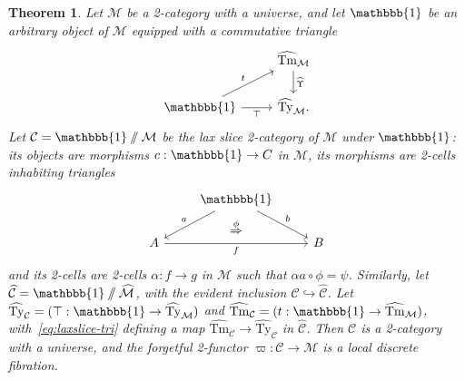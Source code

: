\documentclass[10pt]{article}
\newtheorem{theorem}{Theorem}
\theoremstyle{definition}
\newcommand\M{\mathcal{M}}
\newcommand\Mhat{\widehat{\mathcal{M}}}
\newcommand\Mtyhat{{\widehat{\mathrm{Ty}}_{\M}}}
\newcommand\Mtmhat{{\widehat{\mathrm{Tm}}_{\M}}}
\newcommand\Upshat{{\widehat{\Upsilon}}}
\newcommand\C{\mathcal{C}}
\newcommand\Chat{{\widehat{\mathcal{C}}}}
\newcommand\Ctyhat{{\widehat{\mathrm{Ty}}}_{\C}}
\newcommand\Ctmhat{{\widehat{\mathrm{Tm}}}_{\C}}
\newcommand\vp{\varpi}
\newcommand\one{\mathbbb{1}}
\begin{document}
\begin{theorem}\label{thm:laxslice-2cwf}
  Let $\M$ be a 2-category with a universe, and let $\one$ be an arbitrary object of $\M$ equipped with a commutative triangle
  \begin{equation}
    \begin{tikzcd}
      & \Mtmhat \ar[d,"\Upshat"] \\
      \one \ar[ur,"t"] \ar[r,"\top"'] & \Mtyhat.
    \end{tikzcd}\label{eq:laxslice-tri}
  \end{equation}
  Let $\C = \one\sslash \M$ be the lax slice 2-category of $\M$ under $\one$: its objects are morphisms $c:\one\to C$ in $\M$, its morphisms are 2-cells inhabiting triangles
  \begin{equation}\label{eq:laxslice-mor}
    \begin{tikzcd}
      & \one \ar[dl,"a"'] \ar[dr,"b"] \ar[d,phantom,"\overset{\phi}{\Rightarrow}"] \\
      A \ar[rr,"f"'] & {}& B
    \end{tikzcd}
  \end{equation}
  and its 2-cells are 2-cells $\alpha :f\to g$ in $\M$ such that $\alpha a \circ \phi = \psi$.
  Similarly, let $\Chat = \one\sslash\Mhat$, with the evident inclusion $\C\hookrightarrow\Chat$.
  Let $\Ctyhat = (\top:\one \to \Mtyhat)$ and $\Ctmhat = (t:\one\to\Mtmhat)$, with~\eqref{eq:laxslice-tri} defining a map $\Ctmhat \to \Ctyhat$ in $\Chat$.
  Then $\C$ is a 2-category with a universe, and the forgetful 2-functor $\vp:\C\to\M$ is a local discrete fibration.
\end{theorem}
\end{document}
